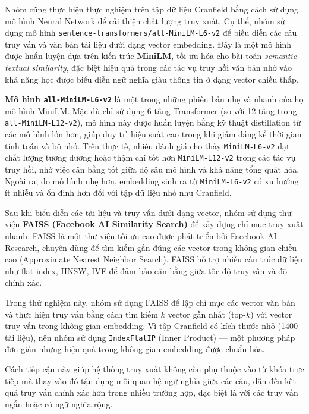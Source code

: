 Nhóm cũng thực hiện thực nghiệm trên tập dữ liệu Cranfield bằng cách sử dụng mô hình Neural Network để cải thiện chất lượng truy xuất. Cụ thể, nhóm sử dụng mô hình \texttt{sentence-transformers/all-MiniLM-L6-v2} để biểu diễn các câu truy vấn và văn bản tài liệu dưới dạng vector embedding. Đây là một mô hình được huấn luyện dựa trên kiến trúc \textbf{MiniLM}, tối ưu hóa cho bài toán \textit{semantic textual similarity}, đặc biệt hiệu quả trong các tác vụ truy hồi văn bản nhờ vào khả năng học được biểu diễn ngữ nghĩa giàu thông tin ở dạng vector chiều thấp.

\textbf{Mô hình \texttt{all-MiniLM-L6-v2}} là một trong những phiên bản nhẹ và nhanh của họ mô hình MiniLM. Mặc dù chỉ sử dụng 6 tầng Transformer (so với 12 tầng trong \texttt{all-MiniLM-L12-v2}), mô hình này được huấn luyện bằng kỹ thuật distillation từ các mô hình lớn hơn, giúp duy trì hiệu suất cao trong khi giảm đáng kể thời gian tính toán và bộ nhớ. Trên thực tế, nhiều đánh giá cho thấy \texttt{MiniLM-L6-v2} đạt chất lượng tương đương hoặc thậm chí tốt hơn \texttt{MiniLM-L12-v2} trong các tác vụ truy hồi, nhờ việc cân bằng tốt giữa độ sâu mô hình và khả năng tổng quát hóa. Ngoài ra, do mô hình nhẹ hơn, embedding sinh ra từ \texttt{MiniLM-L6-v2} có xu hướng ít nhiễu và ổn định hơn đối với tập dữ liệu nhỏ như Cranfield.

Sau khi biểu diễn các tài liệu và truy vấn dưới dạng vector, nhóm sử dụng thư viện \textbf{FAISS (Facebook AI Similarity Search)} để xây dựng chỉ mục truy xuất nhanh. FAISS là một thư viện tối ưu cao được phát triển bởi Facebook AI Research, chuyên dùng để tìm kiếm gần đúng các vector trong không gian chiều cao (Approximate Nearest Neighbor Search). FAISS hỗ trợ nhiều cấu trúc dữ liệu như flat index, HNSW, IVF để đảm bảo cân bằng giữa tốc độ truy vấn và độ chính xác.

Trong thử nghiệm này, nhóm sử dụng FAISS để lập chỉ mục các vector văn bản và thực hiện truy vấn bằng cách tìm kiếm \(k\) vector gần nhất (top-\(k\)) với vector truy vấn trong không gian embedding. Vì tập Cranfield có kích thước nhỏ (1400 tài liệu), nên nhóm sử dụng \texttt{IndexFlatIP} (Inner Product) --- một phương pháp đơn giản nhưng hiệu quả trong không gian embedding được chuẩn hóa.

Cách tiếp cận này giúp hệ thống truy xuất không còn phụ thuộc vào từ khóa trực tiếp mà thay vào đó tận dụng mối quan hệ ngữ nghĩa giữa các câu, dẫn đến kết quả truy vấn chính xác hơn trong nhiều trường hợp, đặc biệt là với các truy vấn ngắn hoặc có ngữ nghĩa rộng.

